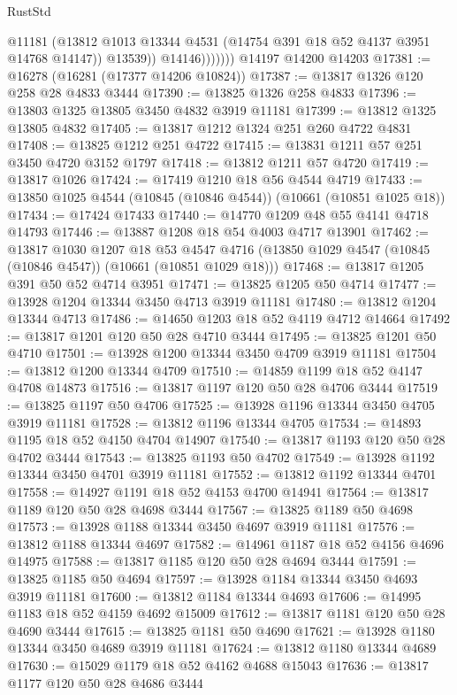 \begin{lexlean}{RustStd}
\begin{coremodule}
                      @11181
                      (@13812 @1013 @13344 @4531 (@14754 @391 @18 @52 @4137 @3951 @14768 @14147))
                      @13539))
                  @14146)))))))
    @14197
    @14200
    @14203
@17381 := @16278 (@16281 (@17377 @14206 @10824))
@17387 := @13817 @1326 @120 @258 @28 @4833 @3444
@17390 := @13825 @1326 @258 @4833
@17396 := @13803 @1325 @13805 @3450 @4832 @3919 @11181
@17399 := @13812 @1325 @13805 @4832
@17405 := @13817 @1212 @1324 @251 @260 @4722 @4831
@17408 := @13825 @1212 @251 @4722
@17415 := @13831 @1211 @57 @251 @3450 @4720 @3152 @1797
@17418 := @13812 @1211 @57 @4720
@17419 := @13817 @1026
@17424 := @17419 @1210 @18 @56 @4544 @4719
@17433 := @13850 @1025 @4544 (@10845 (@10846 @4544)) (@10661 (@10851 @1025 @18))
@17434 := @17424 @17433
@17440 := @14770 @1209 @48 @55 @4141 @4718 @14793
@17446 := @13887 @1208 @18 @54 @4003 @4717 @13901
@17462 := @13817
    @1030
    @1207
    @18
    @53
    @4547
    @4716
    (@13850 @1029 @4547 (@10845 (@10846 @4547)) (@10661 (@10851 @1029 @18)))
@17468 := @13817 @1205 @391 @50 @52 @4714 @3951
@17471 := @13825 @1205 @50 @4714
@17477 := @13928 @1204 @13344 @3450 @4713 @3919 @11181
@17480 := @13812 @1204 @13344 @4713
@17486 := @14650 @1203 @18 @52 @4119 @4712 @14664
@17492 := @13817 @1201 @120 @50 @28 @4710 @3444
@17495 := @13825 @1201 @50 @4710
@17501 := @13928 @1200 @13344 @3450 @4709 @3919 @11181
@17504 := @13812 @1200 @13344 @4709
@17510 := @14859 @1199 @18 @52 @4147 @4708 @14873
@17516 := @13817 @1197 @120 @50 @28 @4706 @3444
@17519 := @13825 @1197 @50 @4706
@17525 := @13928 @1196 @13344 @3450 @4705 @3919 @11181
@17528 := @13812 @1196 @13344 @4705
@17534 := @14893 @1195 @18 @52 @4150 @4704 @14907
@17540 := @13817 @1193 @120 @50 @28 @4702 @3444
@17543 := @13825 @1193 @50 @4702
@17549 := @13928 @1192 @13344 @3450 @4701 @3919 @11181
@17552 := @13812 @1192 @13344 @4701
@17558 := @14927 @1191 @18 @52 @4153 @4700 @14941
@17564 := @13817 @1189 @120 @50 @28 @4698 @3444
@17567 := @13825 @1189 @50 @4698
@17573 := @13928 @1188 @13344 @3450 @4697 @3919 @11181
@17576 := @13812 @1188 @13344 @4697
@17582 := @14961 @1187 @18 @52 @4156 @4696 @14975
@17588 := @13817 @1185 @120 @50 @28 @4694 @3444
@17591 := @13825 @1185 @50 @4694
@17597 := @13928 @1184 @13344 @3450 @4693 @3919 @11181
@17600 := @13812 @1184 @13344 @4693
@17606 := @14995 @1183 @18 @52 @4159 @4692 @15009
@17612 := @13817 @1181 @120 @50 @28 @4690 @3444
@17615 := @13825 @1181 @50 @4690
@17621 := @13928 @1180 @13344 @3450 @4689 @3919 @11181
@17624 := @13812 @1180 @13344 @4689
@17630 := @15029 @1179 @18 @52 @4162 @4688 @15043
@17636 := @13817 @1177 @120 @50 @28 @4686 @3444

\end{coremodule}
\end{lexlean}
